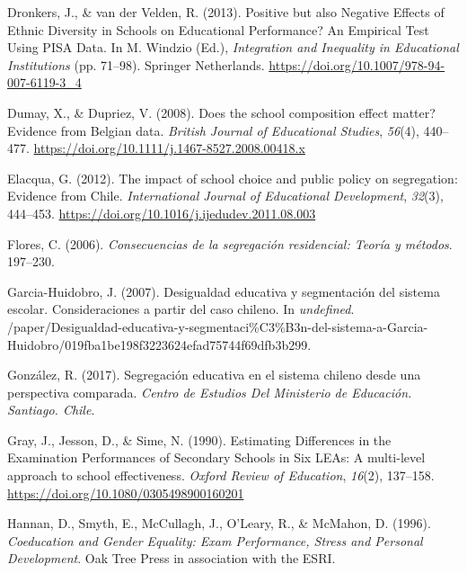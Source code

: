 \documentclass[
]{article}
\begin{document}
\leavevmode\hypertarget{ref-dronkers_positive_2013a}{}%
Dronkers, J., \& van der Velden, R. (2013). Positive but also Negative
Effects of Ethnic Diversity in Schools on Educational Performance? An
Empirical Test Using PISA Data. In M. Windzio (Ed.), \emph{Integration
and Inequality in Educational Institutions} (pp. 71--98). Springer
Netherlands. \url{https://doi.org/10.1007/978-94-007-6119-3_4}

\leavevmode\hypertarget{ref-dumay_does_2008}{}%
Dumay, X., \& Dupriez, V. (2008). Does the school composition effect
matter? Evidence from Belgian data. \emph{British Journal of Educational
Studies}, \emph{56}(4), 440--477.
\url{https://doi.org/10.1111/j.1467-8527.2008.00418.x}

\leavevmode\hypertarget{ref-elacqua_impact_2012}{}%
Elacqua, G. (2012). The impact of school choice and public policy on
segregation: Evidence from Chile. \emph{International Journal of
Educational Development}, \emph{32}(3), 444--453.
\url{https://doi.org/10.1016/j.ijedudev.2011.08.003}

\leavevmode\hypertarget{ref-flores_consecuencias_2006}{}%
Flores, C. (2006). \emph{Consecuencias de la segregación residencial:
Teoría y métodos}. 197--230.

\leavevmode\hypertarget{ref-garcia-huidobro_desigualdad_2007}{}%
Garcia-Huidobro, J. (2007). Desigualdad educativa y segmentación del
sistema escolar. Consideraciones a partir del caso chileno. In
\emph{undefined}.
/paper/Desigualdad-educativa-y-segmentaci\%C3\%B3n-del-sistema-a-Garcia-Huidobro/019fba1be198f3223624efad75744f69dfb3b299.

\leavevmode\hypertarget{ref-gonzalez_segregacion_2017}{}%
González, R. (2017). Segregación educativa en el sistema chileno desde
una perspectiva comparada. \emph{Centro de Estudios Del Ministerio de
Educación. Santiago. Chile}.

\leavevmode\hypertarget{ref-gray_estimating_1990}{}%
Gray, J., Jesson, D., \& Sime, N. (1990). Estimating Differences in the
Examination Performances of Secondary Schools in Six LEAs: A multi-level
approach to school effectiveness. \emph{Oxford Review of Education},
\emph{16}(2), 137--158. \url{https://doi.org/10.1080/0305498900160201}

\leavevmode\hypertarget{ref-hannan_coeducation_1996}{}%
Hannan, D., Smyth, E., McCullagh, J., O'Leary, R., \& McMahon, D.
(1996). \emph{Coeducation and Gender Equality: Exam Performance, Stress
and Personal Development}. Oak Tree Press in association with the ESRI.
\end{document}
